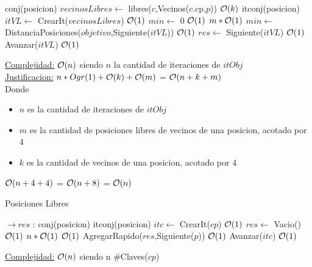 \begin{Algoritmos}
\begin{algorithm}[H]
\begin{algorithmic}[1]
	\State conj(posicion) $vecinosLibres \gets$ libres($c$,Vecinos($c$.cp,$p$)) \Comment $\mathcal{O}(k)$
	\State itconj(posicion) $itVL \gets$ CrearIt($vecinosLibres$) \Comment $\mathcal{O}(1)$
	\State $min \gets$ 0 \Comment $\mathcal{O}(1)$
	 \Comment $m*\mathcal{O}(1)$
			\State $min \gets$ DistanciaPosiciones($objetivo$,Siguiente($itVL$)) \Comment $\mathcal{O}(1)$
			\State $res \gets$ Siguiente($itVL$) \Comment $\mathcal{O}(1)$
		\EndIf
		\State Avanzar($itVL$) \Comment $\mathcal{O}(1)$
	\EndWhile
\EndProcedure
\end{algorithmic}
\underline{Complejidad:} $\mathcal{O}(n)$ siendo $n$ la cantidad de iteraciones de $itObj$ \\
\underline{Justificacion:} $n*Ogr(1)+\mathcal{O}(k)+\mathcal{O}(m)$ = $\mathcal{O}(n+k+m)$\\
Donde
\begin{itemize}
	\item $n$ es la cantidad de iteraciones de $itObj$
	\item $m$ es la cantidad de posiciones libres de vecinos de una posicion, acotado por 4
	\item $k$ es la cantidad de vecinos de una posicion, acotado por 4
\end{itemize}
$\mathcal{O}(n + 4 + 4)$ = $\mathcal{O}(n + 8)$ = $\mathcal{O}(n)$
\end{algorithm}


\begin{algorithm}[H]
\caption{Posiciones Libres}
\begin{algorithmic}[1]
  $\to res$ : conj(posicion)
	\State itconj(posicion) $itc \gets$ CrearIt($cp$) \Comment $\mathcal{O}(1)$
	\State $res \gets$ Vacio() \Comment $\mathcal{O}(1)$
	 \Comment $n*\mathcal{O}(1)$
		 \Comment $\mathcal{O}(1)$
			\State AgregarRapido($res$,Siguiente($p$)) \Comment $\mathcal{O}(1)$
		\EndIf
		\State Avanzar($itc$) \Comment $\mathcal{O}(1)$
	\EndWhile
\EndProcedure
\end{algorithmic}
\underline{Complejidad:} $\mathcal{O}(n)$ siendo n $\#$Claves($cp$)
\end{algorithm}



\end{Algoritmos}
